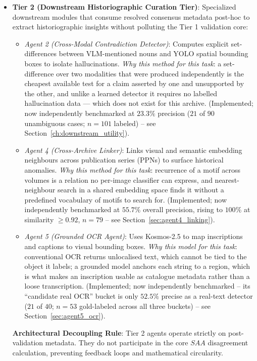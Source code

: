 \documentclass[12pt,a4paper]{report}
\begin{document}
\begin{itemize}
    \item \textbf{Tier 2 (Downstream Historiographic Curation Tier)}: Specialized downstream modules that consume resolved consensus metadata post-hoc to extract historiographic insights without polluting the Tier 1 validation core:
    \begin{itemize}
        \item \textit{Agent 2 (Cross-Modal Contradiction Detector)}: Computes explicit set-differences between VLM-mentioned nouns and YOLO spatial bounding boxes to isolate hallucinations. \emph{Why this method for this task}: a set-difference over two modalities that were produced independently is the cheapest available test for a claim asserted by one and unsupported by the other, and unlike a learned detector it requires no labelled hallucination data --- which does not exist for this archive. (Implemented; now independently benchmarked at $23.3\%$ precision ($21$ of $90$ unambiguous cases; $n=101$ labeled) -- see Section~\ref{ch:downstream_utility}).
        \item \textit{Agent 4 (Cross-Archive Linker)}: Links visual and semantic embedding neighbours across publication series (PPNs) to surface historical anomalies. \emph{Why this method for this task}: recurrence of a motif across volumes is a relation no per-image classifier can express, and nearest-neighbour search in a shared embedding space finds it without a predefined vocabulary of motifs to search for. (Implemented; now independently benchmarked at $55.7\%$ overall precision, rising to $100\%$ at similarity $\ge 0.92$, $n=79$ -- see Section~\ref{sec:agent4_linking}).
        \item \textit{Agent 5 (Grounded OCR Agent)}: Uses Kosmos-2.5 to map inscriptions and captions to visual bounding boxes. \emph{Why this model for this task}: conventional OCR returns unlocalised text, which cannot be tied to the object it labels; a grounded model anchors each string to a region, which is what makes an inscription usable as catalogue metadata rather than a loose transcription. (Implemented; now independently benchmarked -- its ``candidate real OCR'' bucket is only $52.5\%$ precise as a real-text detector ($21$ of $40$; $n=53$ gold-labeled across all three buckets) -- see Section~\ref{sec:agent5_ocr}).
    \end{itemize}
    \begin{flushleft}
    \textbf{Architectural Decoupling Rule}: Tier 2 agents operate strictly on post-validation metadata. They do not participate in the core $SAA$ disagreement calculation, preventing feedback loops and mathematical circularity.
    \end{flushleft}
    

\end{itemize}
\end{document}
